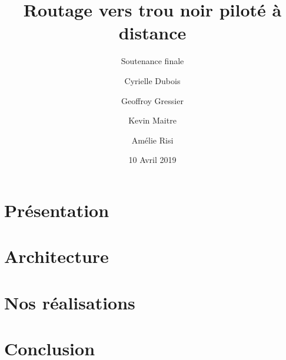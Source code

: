 \documentclass[9pt]{beamer}
\title{Routage vers trou noir piloté à distance}
\subtitle{Soutenance finale}
\author{Cyrielle Dubois \and Geoffroy Gressier \and Kevin Maitre \and Amélie Risi}
\institute{Client : Damien Magoni}
\date{10 Avril 2019}
\begin{document}
\titlepage

\section{Présentation}







\section{Architecture}



\section{Nos réalisations}







\section{Conclusion}


\end{document}
